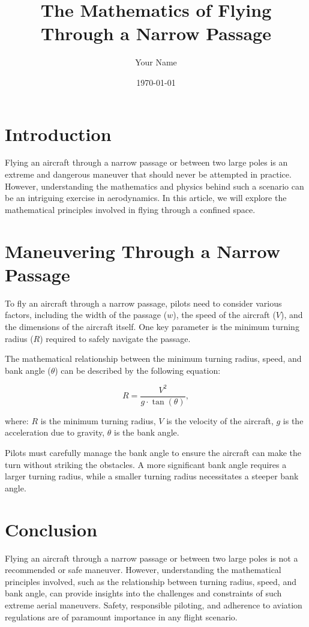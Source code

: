 \documentclass{article}
\title{The Mathematics of Flying Through a Narrow Passage}
\author{Your Name}
\date{\today}
\begin{document}
\maketitle

\section{Introduction}

Flying an aircraft through a narrow passage or between two large poles is an extreme and dangerous maneuver that should never be attempted in practice. However, understanding the mathematics and physics behind such a scenario can be an intriguing exercise in aerodynamics. In this article, we will explore the mathematical principles involved in flying through a confined space.

\section{Maneuvering Through a Narrow Passage}

To fly an aircraft through a narrow passage, pilots need to consider various factors, including the width of the passage ($w$), the speed of the aircraft ($V$), and the dimensions of the aircraft itself. One key parameter is the minimum turning radius ($R$) required to safely navigate the passage.

The mathematical relationship between the minimum turning radius, speed, and bank angle ($\theta$) can be described by the following equation:

\begin{equation}
R = \frac{V^2}{g \cdot \tan(\theta)},
\end{equation}

where:
$R$ is the minimum turning radius,
$V$ is the velocity of the aircraft,
$g$ is the acceleration due to gravity,
$\theta$ is the bank angle.

Pilots must carefully manage the bank angle to ensure the aircraft can make the turn without striking the obstacles. A more significant bank angle requires a larger turning radius, while a smaller turning radius necessitates a steeper bank angle.

\section{Conclusion}

Flying an aircraft through a narrow passage or between two large poles is not a recommended or safe maneuver. However, understanding the mathematical principles involved, such as the relationship between turning radius, speed, and bank angle, can provide insights into the challenges and constraints of such extreme aerial maneuvers. Safety, responsible piloting, and adherence to aviation regulations are of paramount importance in any flight scenario.
\end{document}

